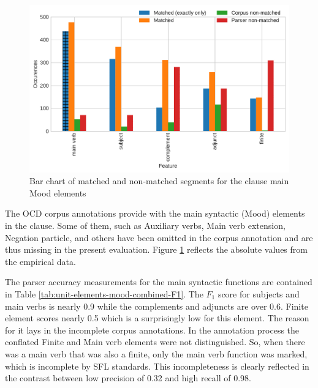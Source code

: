     \begin{figure}[!ht]
    \centering
    \includegraphics[width=.85\textwidth]{evaluation-results/figures/unit-elements-mood-data.pdf}
    \caption{Bar chart of matched and non-matched segments for the clause main Mood elements}
    \label{fig:unit-elements-mood-data}
    \end{figure}
    
    The OCD corpus annotations provide with the main syntactic (Mood) elements in the clause. Some of them, such as Auxiliary verbs, Main verb extension, Negation particle, and others have been omitted in the corpus annotation and are thus missing in the present evaluation. Figure \ref{fig:unit-elements-mood-data} reflects the absolute values from the empirical data. 
    
    The parser accuracy measurements for the main syntactic functions are contained in Table \ref{tab:unit-elements-mood-combined-F1}. The $F_1$ score for subjects and main verbs is nearly 0.9 while the complements and adjuncts are over 0.6. Finite element scores nearly 0.5 which is a surprisingly low for this element. The reason for it lays in the incomplete corpus annotations. In the annotation process the conflated Finite and Main verb elements were not distinguished. So, when there was a main verb that was also a finite, only the main verb function was marked, which is incomplete by SFL standards. This incompleteness is clearly reflected in the contrast between low precision of 0.32 and high recall of 0.98. 
    
